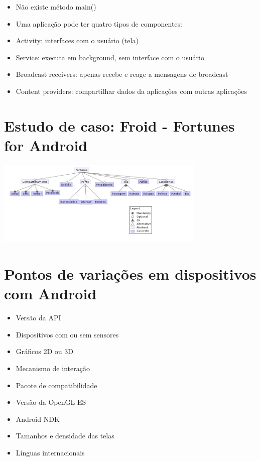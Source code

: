 \documentclass[a4paper,12pt]{report}
\begin{document}
\begin{itemize}
    \item Não existe método main()
    \item Uma aplicação pode ter quatro tipos de componentes:
    \item Activity: interfaces com o usuário (tela)
    \item Service: executa em background, sem interface com o usuário
    \item Broadcast receivers: apenas recebe e reage a mensagens de broadcast
    \item Content providers: compartilhar dados da aplicações com outras aplicações
\end{itemize}

\section{Estudo de caso: Froid - Fortunes for Android}

\includegraphics[width=10cm]{img/fortunes_fm}

\section{Pontos de variações em dispositivos com Android}

\begin{itemize}
    \item Versão da API
    \item Dispositivos com ou sem sensores
    \item Gráficos 2D ou 3D
    \item Mecanismo de interação
    \item Pacote de compatibilidade
    \item Versão da OpenGL ES
    \item Android NDK           
    \item Tamanhos e densidade das telas
    \item Línguas internacionais
\end{itemize}
\end{document}
